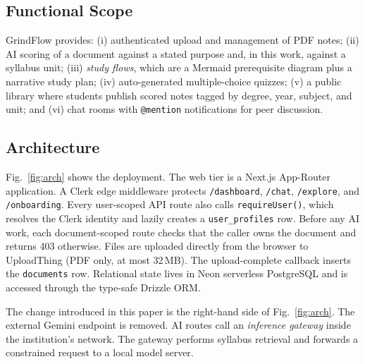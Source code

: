 \documentclass[conference]{IEEEtran}
\begin{document}
\subsection{Functional Scope}
GrindFlow provides: (i) authenticated upload and management of PDF notes;
(ii) AI scoring of a document against a stated purpose and, in this work,
against a syllabus unit; (iii) \emph{study flows}, which are a Mermaid
prerequisite diagram plus a narrative study plan; (iv) auto-generated
multiple-choice quizzes; (v) a public library where students publish scored
notes tagged by degree, year, subject, and unit; and (vi) chat rooms with
\texttt{@mention} notifications for peer discussion.

\subsection{Architecture}
Fig.~\ref{fig:arch} shows the deployment. The web tier is a Next.js
App-Router application. A Clerk edge middleware protects
\texttt{/dashboard}, \texttt{/chat}, \texttt{/explore}, and
\texttt{/onboarding}. Every user-scoped API route also calls
\texttt{requireUser()}, which resolves the Clerk identity and lazily creates a
\texttt{user\_profiles} row. Before any AI work, each document-scoped route
checks that the caller owns the document and returns 403 otherwise. Files are
uploaded directly from the browser to UploadThing (PDF only, at most 32\,MB).
The upload-complete callback inserts the \texttt{documents} row. Relational
state lives in Neon serverless PostgreSQL and is accessed through the
type-safe Drizzle ORM.

The change introduced in this paper is the right-hand side of
Fig.~\ref{fig:arch}. The external Gemini endpoint is removed. AI routes call
an \emph{inference gateway} inside the institution's network. The gateway
performs syllabus retrieval and forwards a constrained request to a local
model server.
\end{document}
